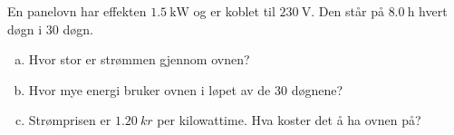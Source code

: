 %
En panelovn har effekten $\SI{1.5}{\kilo\watt}$ og er koblet til $\SI{230}{\volt}$. Den står på $\SI{8.0}{\hour}$ hvert døgn i 30 døgn.
\begin{enumerate}[a)]
    \item Hvor stor er strømmen gjennom ovnen?
    \item Hvor mye energi bruker ovnen i løpet av de 30 døgnene?
    \item Strømprisen er $\SI{1.20}{kr}$ per kilowattime. Hva koster det å ha ovnen på?
\end{enumerate}
%
